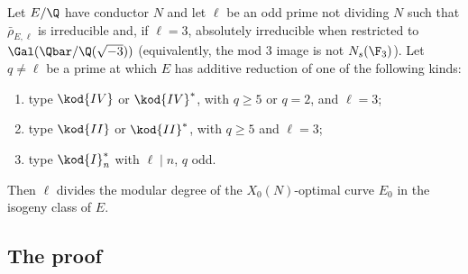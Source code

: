 \begin{theorem}\label{thm:modgalrep:qual}
Let $E/\Q$ have conductor $N$ and let $\ell$ be an odd prime not dividing $N$ such that $\bar\rho_{E,\ell}$ is irreducible and, if $\ell=3$, absolutely irreducible when
restricted to $\Gal(\Qbar/\Q(\sqrt{-3}))$ (equivalently, the mod $3$ image is not $N_s(\F_3)$). Let $q\ne\ell$ be a prime at which $E$ has additive reduction of one of the
following kinds:
\begin{enumerate}[label=(\alph*)]
\item type $\kod{IV}$ or $\kod{IV}^*$, with $q\ge5$ or $q=2$, and $\ell=3$;
\item type $\kod{II}$ or $\kod{II}^*$, with $q\ge5$ and $\ell=3$;
\item type $\kod{I}_n^*$ with $\ell\mid n$, $q$ odd.
\end{enumerate}
Then $\ell$ divides the modular degree of the $X_0(N)$-optimal curve $E_0$ in the isogeny class of $E$.
\end{theorem}

\subsection{The proof}\label{sec:modgalrep:proof-qual}

